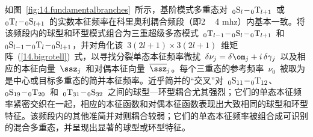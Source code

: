 如图~\ref{fig:14.fundamentalbranches}~所示，基阶模式多重态对~${}_0{\rm S}_l\!-\!{}_0{\rm T}_{l+1}$~或~${}_0{\rm T}_l\!-\!{}_0{\rm S}_{l+1}$~的实数本征频率在科里奥利耦合频段（即2 ~ 4 mhz）内基本一致。将该频段内的球型和环型模式组合为三重超级多态模式~${}_{0}{\rm T}_{l-1}\!-\!{}_0{\rm S}_l\!-\!{}_{0}{\rm T}_{l+1}$~和~${}_{0}{\rm S}_{l-1}\!-\!{}_0{\rm T}_l\!-\!{}_{0}{\rm S}_{l+1}$，并对角化该~$3(2l+1)\times 3(2l+1)$~维矩阵~(\ref{14.bigrotell})~式，以寻找分裂单态本征频率微扰~$\delta\nu_j=\delta\om_j+i\,\delta\gamma_j$~以及相应的本征向量~$\ssz_j$~和对偶本征向量~$\overline{\ssz}_j$。每个三重态的参考频率~$\nu_0$~被取为是中心或目标多重态的简并本征频率。近乎简并的“交叉”对~${}_0{\rm S}_{11}\!-\!{}_0{\rm T}_{12}$、${}_0{\rm S}_{19}\!-\!{}_0{\rm T}_{20}$~和~${}_0{\rm T}_{31}\!-\!{}_0{\rm S}_{32}$~之间的球型—环型耦合尤其强烈；它们的单态本征频率紧密交织在一起，相应的本征函数和对偶本征函数表现出大致相同的球型和环型特征。该频段内的其他准简并对则耦合较弱；它们的单态本征频率被组合成可识别的混合多重态，并呈现出显著的球型或环型特征。

